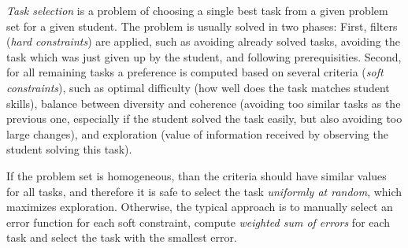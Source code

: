 \emph{Task selection} is a problem of choosing a single best task
from a given problem set for a given student.
The problem is usually solved in two phases:
First, filters (\emph{hard constraints}) are applied,
such as avoiding already solved
tasks, avoiding the task which was just given up by the student,
and following prerequisities.  %
Second, for all remaining tasks a preference is computed based on several criteria
(\emph{soft constraints}), such as
optimal difficulty (how well does the task matches student skills),
balance between diversity and coherence
(avoiding too similar tasks as the previous one, especially if the student
solved the task easily, but also avoiding too large changes),
and exploration (value of information received by observing the student solving this task).

If the problem set is homogeneous, than the criteria should have similar values
for all tasks, and therefore it is safe to select the task \emph{uniformly at random},
which maximizes exploration.
Otherwise, the typical approach is to manually select an error function for each
soft constraint, compute \emph{weighted sum of errors} for each task and
select the task with the smallest error.



